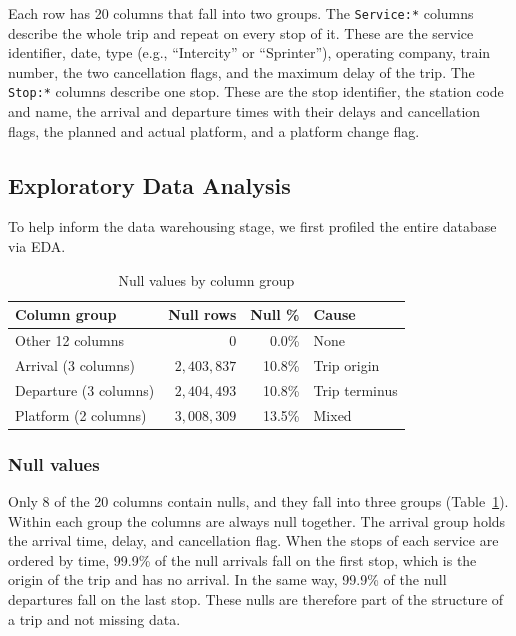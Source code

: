 Each row has 20 columns that fall into two groups. The \texttt{Service:*} columns describe the whole trip and repeat on every stop of it. These are the service identifier, date, type (e.g., ``Intercity'' or ``Sprinter''), operating company, train number, the two cancellation flags, and the maximum delay of the trip. The \texttt{Stop:*} columns describe one stop. These are the stop identifier, the station code and name, the arrival and departure times with their delays and cancellation flags, the planned and actual platform, and a platform change flag.

\subsection{Exploratory Data Analysis}
\label{subsec:eda}

To help inform the data warehousing stage, we first profiled the entire database via EDA.

\begin{table}[t]
\centering
\small
\caption{Null values by column group}
\label{tab:eda_columns}
\begin{tabularx}{\columnwidth}{l r r X}
\toprule
\textbf{Column group} & \textbf{Null rows} & \textbf{Null \%} & \textbf{Cause} \\
\midrule
Other 12 columns & 0 & 0.0\% & None \\
Arrival (3 columns) & $2{,}403{,}837$ & 10.8\% & Trip origin \\
Departure (3 columns) & $2{,}404{,}493$ & 10.8\% & Trip terminus \\
Platform (2 columns) & $3{,}008{,}309$ & 13.5\% & Mixed \\
\bottomrule
\end{tabularx}
\end{table}

\subsubsection{Null values}
Only 8 of the 20 columns contain nulls, and they fall into three groups (Table~\ref{tab:eda_columns}). Within each group the columns are always null together. The arrival group holds the arrival time, delay, and cancellation flag. When the stops of each service are ordered by time, 99.9\% of the null arrivals fall on the first stop, which is the origin of the trip and has no arrival. In the same way, 99.9\% of the null departures fall on the last stop. These nulls are therefore part of the structure of a trip and not missing data.

